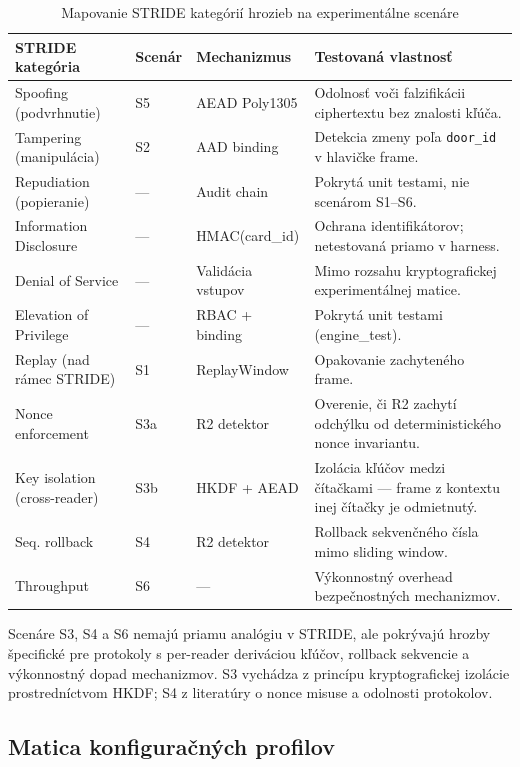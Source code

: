 \begin{table}[htbp]
\renewcommand{\arraystretch}{1.3}
\centering
\caption{Mapovanie STRIDE kategórií hrozieb na experimentálne scenáre}
\label{tab:stride-scenarios}
\small
\begin{tabular}{l l l p{4.5cm}}
\toprule
\textbf{STRIDE kategória} & \textbf{Scenár} & \textbf{Mechanizmus} & \textbf{Testovaná vlastnosť} \\
\midrule
Spoofing (podvrhnutie) & S5 & AEAD Poly1305 & Odolnosť voči falzifikácii ciphertextu bez znalosti kľúča. \\
Tampering (manipulácia) & S2 & AAD binding & Detekcia zmeny poľa \texttt{door\_id} v hlavičke frame. \\
Repudiation (popieranie) & --- & Audit chain & Pokrytá unit testami, nie scenárom S1--S6. \\
Information Disclosure & --- & HMAC(card\_id) & Ochrana identifikátorov; netestovaná priamo v harness. \\
Denial of Service & --- & Validácia vstupov & Mimo rozsahu kryptografickej experimentálnej matice. \\
Elevation of Privilege & --- & RBAC + binding & Pokrytá unit testami (engine\_test). \\
Replay (nad rámec STRIDE) & S1 & ReplayWindow & Opakovanie zachyteného frame. \\
Nonce enforcement & S3a & R2 detektor & Overenie, či R2 zachytí odchýlku od deterministického nonce invariantu. \\
Key isolation (cross-reader) & S3b & HKDF + AEAD & Izolácia kľúčov medzi čítačkami --- frame z kontextu inej čítačky je odmietnutý. \\
Seq. rollback & S4 & R2 detektor & Rollback sekvenčného čísla mimo sliding window. \\
Throughput & S6 & --- & Výkonnostný overhead bezpečnostných mechanizmov. \\
\bottomrule
\end{tabular}
\end{table}

\noindent Scenáre S3, S4 a S6 nemajú priamu analógiu v STRIDE, ale pokrývajú hrozby špecifické pre protokoly s per-reader deriváciou kľúčov, rollback sekvencie a výkonnostný dopad mechanizmov. S3 vychádza z princípu kryptografickej izolácie prostredníctvom HKDF\cite{RFC5869}; S4 z literatúry o nonce misuse a odolnosti protokolov\cite{RogawayNonceMisuse2004,BellareNonceMisuse2006}.

\subsection{Matica konfiguračných profilov}
\label{sec:profile_matrix}

